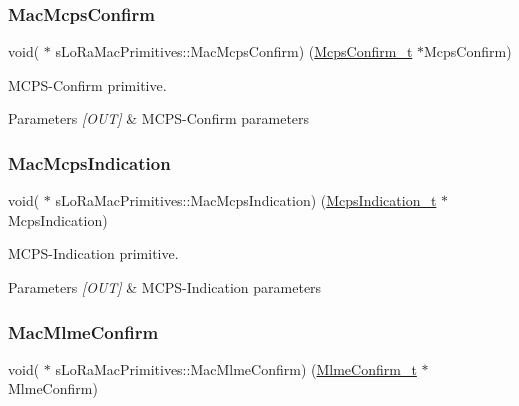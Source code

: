 \subsubsection{\texorpdfstring{Mac\+Mcps\+Confirm}{MacMcpsConfirm}}
{\footnotesize\ttfamily void( $\ast$ s\+Lo\+Ra\+Mac\+Primitives\+::\+Mac\+Mcps\+Confirm) (\hyperlink{group__LORAMAC_ga925536babf8abe83918a19f5ae88bd44}{Mcps\+Confirm\+\_\+t} $\ast$Mcps\+Confirm)}



M\+C\+P\+S-\/\+Confirm primitive. 


\begin{DoxyParams}{Parameters}
{\em \mbox{[}\+O\+U\+T\mbox{]}} & M\+C\+P\+S-\/\+Confirm parameters \\
\hline
\end{DoxyParams}
\mbox{\label{structsLoRaMacPrimitives_aa7eb02232243c705b7ac43a89fa3aed0}} 
\subsubsection{\texorpdfstring{Mac\+Mcps\+Indication}{MacMcpsIndication}}
{\footnotesize\ttfamily void( $\ast$ s\+Lo\+Ra\+Mac\+Primitives\+::\+Mac\+Mcps\+Indication) (\hyperlink{group__LORAMAC_ga202591b6553d63fae89bd42787496616}{Mcps\+Indication\+\_\+t} $\ast$Mcps\+Indication)}



M\+C\+P\+S-\/\+Indication primitive. 


\begin{DoxyParams}{Parameters}
{\em \mbox{[}\+O\+U\+T\mbox{]}} & M\+C\+P\+S-\/\+Indication parameters \\
\hline
\end{DoxyParams}
\mbox{\label{structsLoRaMacPrimitives_af92fa5e7a0dcb1139adc5f60ef1538c1}} 
\subsubsection{\texorpdfstring{Mac\+Mlme\+Confirm}{MacMlmeConfirm}}
{\footnotesize\ttfamily void( $\ast$ s\+Lo\+Ra\+Mac\+Primitives\+::\+Mac\+Mlme\+Confirm) (\hyperlink{group__LORAMAC_ga73d9d9e11e282a6c258c4d22865fe824}{Mlme\+Confirm\+\_\+t} $\ast$Mlme\+Confirm)}



